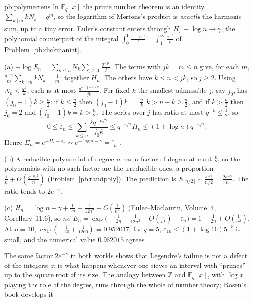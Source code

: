 \begin{solution}{pb:polymertens}
\idea In $\mathbb F_q[x]$ the prime number theorem is an identity, $\sum_{k\mid m}kN_k=q^m$, so the logarithm of Mertens's product is \emph{exactly} the harmonic sum, up to a tiny
error. Euler's constant enters through $H_n-\log n\to\gamma$, the polynomial counterpart of the integral $\int_0^1\frac{1-e^{-t}}t-\int_1^\infty\frac{e^{-t}}t$ of Problem~\ref{pb:dickmanint}.

\writeup (a) $-\log E_n=\sum_{k\le n}N_k\sum_{j\ge1}\frac{q^{-jk}}j$. The terms with $jk=m\le n$ give, for each $m$, $\frac{q^{-m}}m\sum_{k\mid m}kN_k=\frac1m$; together $H_n$.
The others have $k\le n<jk$, so $j\ge2$. Using $N_k\le\frac{q^k}k$, each is at most $\frac{q^{-(j-1)k}}{jk}$. For fixed $k$ the smallest admissible $j$, say $j_0$, has $(j_0-1)k\ge\frac n2$:
if $k\le\frac n2$ then $(j_0-1)k=\lfloor\frac nk\rfloor k>n-k\ge\frac n2$, and if $k>\frac n2$ then $j_0=2$ and $(j_0-1)k=k>\frac n2$. The series over $j$ has ratio at most $q^{-k}\le\frac12$, so
\[
0\le\varepsilon_n\le\sum_{k\le n}\frac{2q^{-n/2}}{j_0k}\le q^{-n/2}H_n\le(1+\log n)q^{-n/2}.
\]
Hence $E_n=e^{-H_n-\varepsilon_n}\sim e^{-\log n-\gamma}=\frac{e^{-\gamma}}n$.

(b) A reducible polynomial of degree $n$ has a factor of degree at most $\frac n2$, so the polynomials with no such factor are the irreducible ones, a proportion $\frac1n+O(\frac{q^{-n/2}}n)$
(Problem~\ref{pb:randpoly}). The prediction is $E_{\lfloor n/2\rfloor}\sim\frac{e^{-\gamma}}{n/2}=\frac{2e^{-\gamma}}n$. The ratio tends to $2e^{-\gamma}$.

(c) $H_n=\log n+\gamma+\frac1{2n}-\frac1{12n^2}+O(\frac1{n^4})$ (Euler--Maclaurin, Volume~4, Corollary~11.6), so $ne^\gamma E_n=\exp\bigl(-\frac1{2n}+\frac1{12n^2}+O(\frac1{n^4})-\varepsilon_n\bigr)=1-\frac1{2n}+O(\frac1{n^2})$.
At $n=10$, $\exp(-\frac1{20}+\frac1{1200})=0.952017$; for $q=5$, $\varepsilon_{10}\le(1+\log10)5^{-5}$ is small, and the numerical value $0.952015$ agrees.

\leads The same factor $2e^{-\gamma}$ in both worlds shows that Legendre's failure is not a defect of the integers: it is what happens whenever one sieves an interval with ``primes'' up to the
square root of its size. The analogy between $\mathbb Z$ and $\mathbb F_q[x]$, with $\log x$ playing the role of the degree, runs through the whole of number theory; Rosen's book develops it.
\end{solution}

